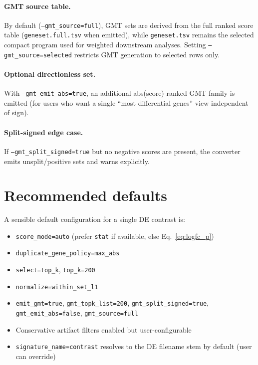 \documentclass[11pt]{article}
\begin{document}
\paragraph{GMT source table.}
By default (\texttt{--gmt\_source=full}), GMT sets are derived from the full ranked score table (\texttt{geneset.full.tsv} when emitted), while \texttt{geneset.tsv} remains the selected compact program used for weighted downstream analyses.
Setting \texttt{--gmt\_source=selected} restricts GMT generation to selected rows only.

\paragraph{Optional directionless set.}
With \texttt{--gmt\_emit\_abs=true}, an additional abs(score)-ranked GMT family is emitted (for users who want a single ``most differential genes'' view independent of sign).

\paragraph{Split-signed edge case.}
If \texttt{--gmt\_split\_signed=true} but no negative scores are present, the converter emits unsplit/positive sets and warns explicitly.

\section{Recommended defaults}
A sensible default configuration for a single DE contrast is:
\begin{itemize}[leftmargin=2em]
\item \texttt{score\_mode=auto} (prefer \texttt{stat} if available, else Eq.\ \ref{eq:logfc_p})
\item \texttt{duplicate\_gene\_policy=max\_abs}
\item \texttt{select=top\_k}, \texttt{top\_k=200}
\item \texttt{normalize=within\_set\_l1}
\item \texttt{emit\_gmt=true}, \texttt{gmt\_topk\_list=200}, \texttt{gmt\_split\_signed=true}, \texttt{gmt\_emit\_abs=false}, \texttt{gmt\_source=full}
\item Conservative artifact filters enabled but user-configurable
\item \texttt{signature\_name=contrast} resolves to the DE filename stem by default (user can override)
\end{itemize}
\end{document}
